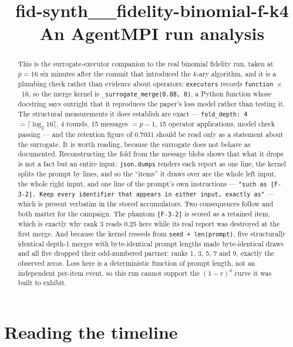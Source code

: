 \documentclass[11pt]{article}
\title{\textbf{fid-synth\_\_fidelity-binomial-f-k4}\\[2pt]\large An AgentMPI run analysis}
\author{}
\date{}
\begin{document}
\maketitle

\begin{abstract}
This is the surrogate-executor companion to the real binomial fidelity run, taken at $p=16$
six minutes after the commit that introduced the $k$-ary algorithm, and it is a plumbing
check rather than evidence about operators: \texttt{executors} records
\texttt{function}~$\times$~16, so the merge kernel is \texttt{\_surrogate\_merge(0.08, 0)},
a Python function whose docstring says outright that it reproduces the paper's loss model
rather than testing it. The structural measurements it does establish are exact ---
\texttt{fold\_depth: 4} $= \lceil\log_2 16\rceil$, 4 rounds, 15 messages $= p-1$, 15
operator applications, model check passing --- and the retention figure of 0.7031 should be
read only as a statement about the surrogate. It is worth reading, because the surrogate
does not behave as documented. Reconstructing the fold from the message blobs shows that
what it drops is not a fact but an entire input: \texttt{json.dumps} renders each report as
one line, the kernel splits the prompt by lines, and so the ``items'' it draws over are the
whole left input, the whole right input, and one line of the prompt's own instructions ---
\texttt{"such as [F-3-2]. Keep every identifier that appears in either input, exactly as"}
--- which is present verbatim in the stored accumulators. Two consequences follow and both
matter for the campaign. The phantom \texttt{[F-3-2]} is scored as a retained item, which
is exactly why rank 3 reads 0.25 here while its real report was destroyed at the first
merge. And because the kernel reseeds from \texttt{seed + len(prompt)}, five structurally
identical depth-1 merges with byte-identical prompt lengths made byte-identical draws and
all five dropped their odd-numbered partner: ranks 1, 3, 5, 7 and 9, exactly the observed
zeros. Loss here is a deterministic function of prompt length, not an independent
per-item event, so this run cannot support the $(1-r)^d$ curve it was built to exhibit.
\end{abstract}



\section{Reading the timeline}
\end{document}
